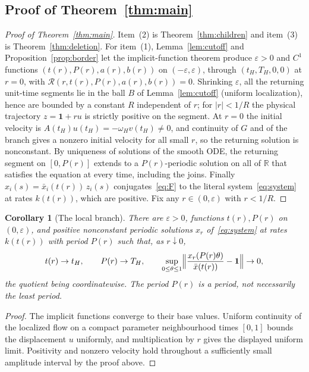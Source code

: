 \documentclass[11pt,a4paper]{article}
\theoremstyle{plain}
\newtheorem{corollary}[theorem]{Corollary}
\theoremstyle{definition}
\theoremstyle{remark}
\newcommand{\R}{\mathbb{R}}
\newcommand{\ones}{\mathbf{1}}
\newcommand{\xbar}{\bar x}
\begin{document}
\subsection{Proof of Theorem~\ref{thm:main}}

\begin{proof}[Proof of Theorem~\ref{thm:main}]
Item~(2) is Theorem~\ref{thm:children} and item~(3) is Theorem~\ref{thm:deletion}. For item~(1), Lemma~\ref{lem:cutoff} and Proposition~\ref{prop:border} let the implicit-function theorem produce $\varepsilon>0$ and $C^1$ functions $(t(r),P(r),a(r),b(r))$ on $(-\varepsilon,\varepsilon)$, through $(t_H,T_H,0,0)$ at $r=0$, with $\mathcal R(r,t(r),P(r),a(r),b(r))=0$. Shrinking $\varepsilon$, all the returning unit-time segments lie in the ball $B$ of Lemma~\ref{lem:cutoff} (uniform localization), hence are bounded by a constant $R$ independent of $r$; for $|r|<1/R$ the physical trajectory $z=\ones+ru$ is strictly positive on the segment. At $r=0$ the initial velocity is $A(t_H)u(t_H)=-\omega_Hv(t_H)\ne0$, and continuity of $G$ and of the branch gives a nonzero initial velocity for all small $r$, so the returning solution is nonconstant. By uniqueness of solutions of the smooth ODE, the returning segment on $[0,P(r)]$ extends to a $P(r)$-periodic solution on all of $\R$ that satisfies the equation at every time, including the joins. Finally $x_i(s)=\xbar_i(t(r))\,z_i(s)$ conjugates~\eqref{eq:F} to the literal system~\eqref{eq:system} at rates $k(t(r))$, which are positive. Fix any $r\in(0,\varepsilon)$ with $r<1/R$.
\end{proof}

\begin{corollary}[The local branch]\label{cor:branch}
There are $\varepsilon>0$, functions $t(r),P(r)$ on $(0,\varepsilon)$, and positive nonconstant periodic solutions $x_r$ of~\eqref{eq:system} at rates $k(t(r))$ with period $P(r)$ such that, as $r\downarrow0$,
\[
t(r)\to t_H,\qquad P(r)\to T_H,\qquad
\sup_{0\le\theta\le1}\Bigl\|\frac{x_r(P(r)\theta)}{\xbar(t(r))}-\ones\Bigr\|\to0,
\]
the quotient being coordinatewise. The period $P(r)$ is a period, not necessarily the least period.
\end{corollary}

\begin{proof}
The implicit functions converge to their base values. Uniform continuity of the localized flow on a compact parameter neighbourhood times $[0,1]$ bounds the displacement $u$ uniformly, and multiplication by $r$ gives the displayed uniform limit. Positivity and nonzero velocity hold throughout a sufficiently small amplitude interval by the proof above.
\end{proof}
\end{document}
